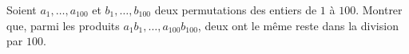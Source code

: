 Soient $a_1, \ldots, a_{100}$ et $b_1, \ldots, b_{100}$ deux permutations des entiers de $1$ à $100$. Montrer que, parmi les produits $a_1b_1, \ldots, a_{100}b_{100}$, deux ont le même reste dans la division par $100$.
